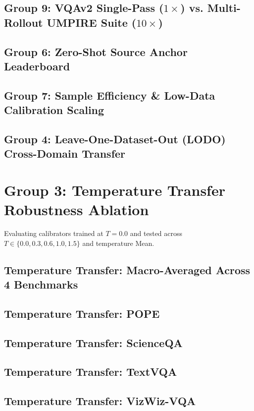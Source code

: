 \documentclass[11pt,a4paper]{article}
\begin{document}
\subsection{Group 9: VQAv2 Single-Pass ($1\times$) vs. Multi-Rollout UMPIRE Suite ($10\times$)}

\clearpage
\subsection{Group 6: Zero-Shot Source Anchor Leaderboard}

\clearpage
\subsection{Group 7: Sample Efficiency \& Low-Data Calibration Scaling}

\clearpage
\subsection{Group 4: Leave-One-Dataset-Out (LODO) Cross-Domain Transfer}

\clearpage
\section{Group 3: Temperature Transfer Robustness Ablation}
Evaluating calibrators trained at $T = 0.0$ and tested across $T \in \{0.0, 0.3, 0.6, 1.0, 1.5\}$ and temperature Mean.
\subsection{Temperature Transfer: Macro-Averaged Across 4 Benchmarks}

\clearpage
\subsection{Temperature Transfer: POPE}

\clearpage
\subsection{Temperature Transfer: ScienceQA}

\clearpage
\subsection{Temperature Transfer: TextVQA}

\clearpage
\subsection{Temperature Transfer: VizWiz-VQA}

\clearpage
\end{document}
